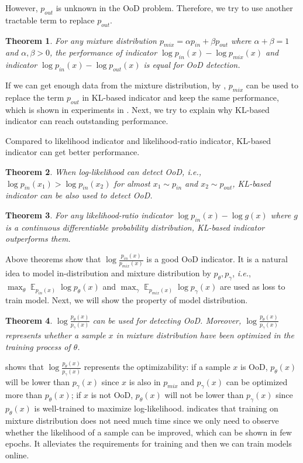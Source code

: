 \documentclass[letterpaper]{article} %
\newtheorem{theorem}{Theorem}
\newcommand{\IE}{\textit{i.e.}, }
\newcommand{\E}{\operatorname{\mathbb{E}}}
\newcommand{\pin}{p_{in}}
\newcommand{\pout}{p_{out}}
\newcommand{\pmix}{p_{mix}}
\begin{document}
However, $\pout$ is unknown in the OoD problem. Therefore, we try to use another tractable term to replace $\pout$. 

\begin{theorem}\label{thm2}
	For any mixture distribution $\pmix = \alpha \pin + \beta \pout$ where $\alpha + \beta = 1$ and $\alpha, \beta > 0$, the performance of indicator $\log \pin(x) - \log \pmix(x)$ and indicator $\log \pin(x) - \log \pout(x)$ is equal for OoD detection. 
\end{theorem}

If we can get enough data from the mixture distribution, by , $\pmix$ can be used to replace the term $\pout$ in KL-based indicator and keep the same performance, which is shown in experiments in . Next, we try to explain why KL-based indicator can reach outstanding performance.

Compared to likelihood indicator and likelihood-ratio indicator, KL-based indicator can get better performance. 
\begin{theorem}\label{thm3}
When log-likelihood can detect OoD, \IE $\log \pin(x_1) > \log \pin(x_2)$ for almost $x_1 \sim \pin$ and $x_2 \sim \pout$, KL-based indicator can be also used to detect OoD. 
\end{theorem}

\begin{theorem}\label{thm4}
For any likelihood-ratio indicator $\log \pin(x) - \log g(x)$ where $g$ is a continuous differentiable probability distribution, KL-based indicator outperforms them. 
\end{theorem}

Above theorems show that $\log \frac{\pin(x)}{\pmix(x)}$ is a good OoD indicator. It is a natural idea to model in-distribution and mixture distribution by $p_\theta, p_\gamma$, \IE $\max_\theta \E_{\pin(x)} \log p_\theta(x)$ and $\max_\gamma \E_{\pmix(x)} \log p_\gamma(x)$ are used as loss to train model. 
Next, we will show the property of model distribution. 

\begin{theorem}\label{thm5}
	$\log \frac{p_\theta(x)}{p_\gamma(x)}$ can be used for detecting OoD. Moreover, $\log \frac{p_\theta(x)}{p_\gamma(x)}$ represents whether a sample $x$ in mixture distribution have been optimized in the training process of $\theta$. 
\end{theorem}

 shows that $\log \frac{p_\theta(x)}{p_\gamma(x)}$ represents the optimizability: if a sample $x$ is OoD, $p_\theta(x)$ will be lower than $p_\gamma(x)$ since $x$ is also in $\pmix$ and $p_\gamma(x)$ can be optimized more than $p_\theta(x)$; if $x$ is not OoD, $p_\theta(x)$ will not be lower than $p_\gamma(x)$ since $p_\theta(x)$ is well-trained to maximize log-likelihood.  indicates that training on mixture distribution does not need much time since we only need to observe whether the likelihood of a sample can be improved, which can be shown in few epochs. It alleviates the requirements for training and then we can train models online. 
\end{document}
